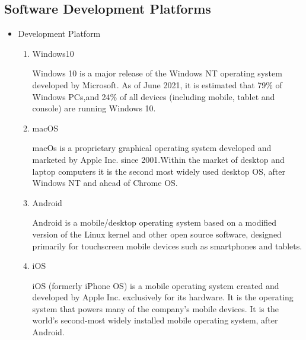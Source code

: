 \documentclass[conference]{IEEEtran}
\begin{document}
\subsection{Software Development Platforms}\label{AA}
\setlength{\parindent}{2ex}
\begin{itemize}
\setlength{\parindent}{2ex}
    \item Development Platform
    \begin{enumerate}
    \setlength{\parindent}{2ex}
    \setlength{\parskip}{0.5em}
        \item Windows10  
        
        Windows 10 is a major release of the Windows NT operating system developed by Microsoft. As of June 2021, it is estimated that 79\% of Windows PCs\cite{Android1},and 24\% of all devices \cite{Android2}(including mobile, tablet and console) are running Windows 10.
        \item macOS
        
        macOs is a proprietary graphical operating system developed and marketed by Apple Inc. since 2001.Within the market of desktop and laptop computers it is the second most widely used desktop OS, after Windows NT and ahead of Chrome OS.

        \item Android 
        
        Android is a mobile/desktop operating system based on a modified version of the Linux kernel and other open source software, designed primarily for touchscreen mobile devices such as smartphones and tablets.
        
        \item iOS  
        
        iOS (formerly iPhone OS) is a mobile operating system created and developed by Apple Inc. exclusively for its hardware. It is the operating system that powers many of the company's mobile devices. It is the world's second-most widely installed mobile operating system, after Android.

    \end{enumerate}
\end{itemize}
\vspace{0.5mm}
\end{document}
